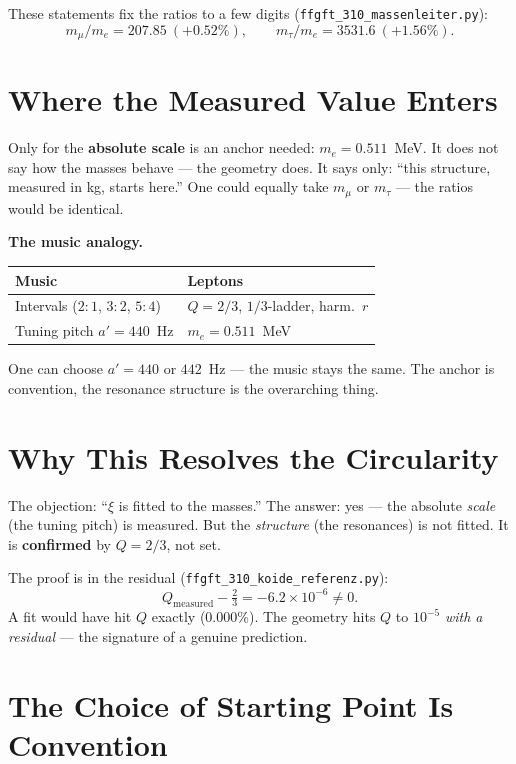 These statements fix the ratios to a few digits
(\texttt{ffgft\_310\_massenleiter.py}):
\[
  m_\mu/m_e = 207.85 \ (+0.52\%), \qquad
  m_\tau/m_e = 3531.6 \ (+1.56\%).
\]

\chapter{Where the Measured Value Enters}

Only for the \textbf{absolute scale} is an anchor needed:
$m_e = 0.511$~MeV. It does not say how the masses behave — the geometry
does. It says only: ``this structure, measured in kg, starts here.'' One
could equally take $m_\mu$ or $m_\tau$ — the ratios would be identical.

\textbf{The music analogy.}

\begin{center}
\begin{tabular}{ll}
\toprule
Music & Leptons \\
\midrule
Intervals ($2{:}1$, $3{:}2$, $5{:}4$) & $Q=2/3$, $1/3$-ladder, harm.\ $r$ \\
Tuning pitch $a' = 440$~Hz & $m_e = 0.511$~MeV \\
\bottomrule
\end{tabular}
\end{center}

One can choose $a' = 440$ or $442$~Hz — the music stays the same. The
anchor is convention, the resonance structure is the overarching thing.

\chapter{Why This Resolves the Circularity}

The objection: ``$\xi$ is fitted to the masses.'' The answer: yes — the
absolute \emph{scale} (the tuning pitch) is measured. But the
\emph{structure} (the resonances) is not fitted. It is \textbf{confirmed}
by $Q = 2/3$, not set.

The proof is in the residual
(\texttt{ffgft\_310\_koide\_referenz.py}):
\[
  Q_\text{measured} - \tfrac{2}{3} = -6.2 \times 10^{-6} \neq 0.
\]
A fit would have hit $Q$ exactly ($0.000\%$). The geometry hits $Q$ to
$10^{-5}$ \emph{with a residual} — the signature of a genuine prediction.

\chapter{The Choice of Starting Point Is Convention}

